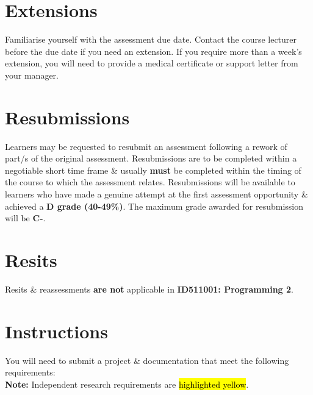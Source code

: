 \documentclass{article}
\begin{document}
\section*{Extensions}
Familiarise yourself with the assessment due date. Contact the course lecturer before the due date if you need an extension. If you require more than a week's extension, you will need to provide a medical certificate or support letter from your manager.

\section*{Resubmissions}
Learners may be requested to resubmit an assessment following a rework of part/s of the original assessment. Resubmissions are to be completed within a negotiable short time frame \& usually \textbf{must} be completed within the timing of the course to which the assessment relates. Resubmissions will be available to learners who have made a genuine attempt at the first assessment opportunity \& achieved a \textbf{D grade (40-49\%)}. The maximum grade awarded for resubmission will be \textbf{C-}.

\section*{Resits}
Resits \& reassessments \textbf{are not} applicable in \textbf{ID511001: Programming 2}.

\section*{Instructions}
You will need to submit a project \& documentation that meet the following requirements:\\

\textbf{Note:} Independent research requirements are \hl{highlighted yellow}.
\end{document}
